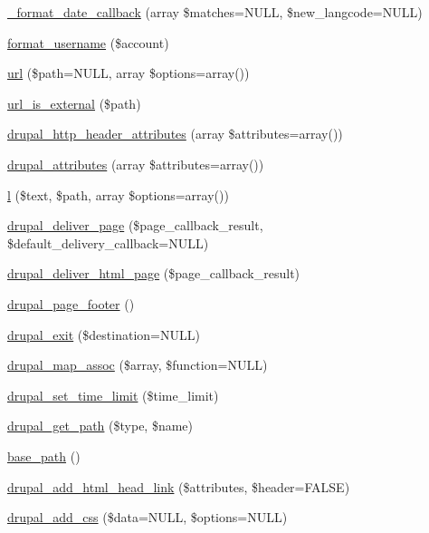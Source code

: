 \begin{DoxyCompactItemize}
\hyperlink{group__format_gafbd5625a63c5da6e62dd6a53a314dfcd}{\_\-format\_\-date\_\-callback} (array \$matches=NULL, \$new\_\-langcode=NULL)
\item 
\hyperlink{group__format_ga7124a026ecfacc51c57a75fcc083f136}{format\_\-username} (\$account)
\item 
\hyperlink{common_8inc_a43b2a0594431556db49df980801d8807}{url} (\$path=NULL, array \$options=array())
\item 
\hyperlink{common_8inc_a64a2003ba42a719fc38a046a3507ad56}{url\_\-is\_\-external} (\$path)
\item 
\hyperlink{common_8inc_a70f1ffdd840f920428c2a709f26125dc}{drupal\_\-http\_\-header\_\-attributes} (array \$attributes=array())
\item 
\hyperlink{group__sanitization_gacf11629fb3d1ebf200863e2d15380b4a}{drupal\_\-attributes} (array \$attributes=array())
\item 
\hyperlink{common_8inc_ad3b36c06dc46250b8d22b8d0d2e7bd97}{l} (\$text, \$path, array \$options=array())
\item 
\hyperlink{common_8inc_a1537b4ccc064fb7d8106effcac8caac3}{drupal\_\-deliver\_\-page} (\$page\_\-callback\_\-result, \$default\_\-delivery\_\-callback=NULL)
\item 
\hyperlink{common_8inc_a05ab0d6e81d6cbe2a6b9f645b9e710ec}{drupal\_\-deliver\_\-html\_\-page} (\$page\_\-callback\_\-result)
\item 
\hyperlink{common_8inc_a64bc7d539a74e850935d73968788abd3}{drupal\_\-page\_\-footer} ()
\item 
\hyperlink{common_8inc_abe82fff35edd9a4da0d3fe4ef1a95614}{drupal\_\-exit} (\$destination=NULL)
\item 
\hyperlink{common_8inc_a72b55fe42aa726cc506660138abd3307}{drupal\_\-map\_\-assoc} (\$array, \$function=NULL)
\item 
\hyperlink{group__php__wrappers_ga0507eefd9cd1db602b2184d0fae35097}{drupal\_\-set\_\-time\_\-limit} (\$time\_\-limit)
\item 
\hyperlink{common_8inc_ae3bbe8f97bf07bb0eaf4580c98f9bf94}{drupal\_\-get\_\-path} (\$type, \$name)
\item 
\hyperlink{common_8inc_ae227697e9c239f09fd7e36f71afde771}{base\_\-path} ()
\item 
\hyperlink{common_8inc_aad501b017775a67b155fe5e441f1ad9d}{drupal\_\-add\_\-html\_\-head\_\-link} (\$attributes, \$header=FALSE)
\item 
\hyperlink{common_8inc_a2c5bb2667efb44b02f1a105c0bfdebe5}{drupal\_\-add\_\-css} (\$data=NULL, \$options=NULL)

\end{DoxyCompactItemize}

